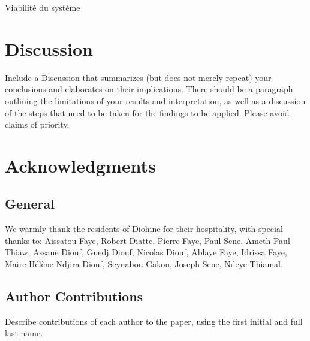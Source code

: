 \documentclass{article}
\begin{document}
Viabilité du système 


\section{Discussion}
Include a Discussion that summarizes (but does not merely repeat) your conclusions and elaborates on their implications. There should be a paragraph outlining the limitations of your results and interpretation, as well as a discussion of the steps that need to be taken for the findings to be applied. Please avoid claims of priority. 

\section*{Acknowledgments}

\subsection*{General} 
We warmly thank the residents of Diohine for their hospitality, with special thanks to: Aissatou Faye, Robert Diatte, Pierre Faye, Paul Sene, Ameth Paul Thiaw, Assane Diouf, Guedj Diouf, Nicolas Diouf, Ablaye Faye, Idrissa Faye, Maire-Hélène Ndjira Diouf, Seynabou Gakou, Joseph Sene, Ndeye Thiamal.

\subsection*{Author Contributions} 
Describe contributions of each author to the paper, using the first initial and full last name. 
\end{document}

